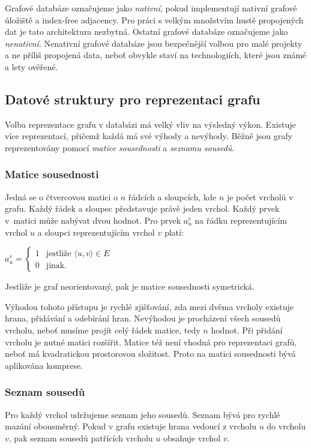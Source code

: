 \documentclass[
  program=infoi,
  biblatex=true,
  figures=true,
  glossaries=false,
  index,
  sourcecodes=true
]{kidiplom}
\begin{document}
Grafové databáze označujeme jako \textit{nativní}, pokud implementují nativní grafové úložiště a index-free adjacency. Pro práci s velkým množstvím hustě propojených dat je tato architektura nezbytná. Ostatní grafové databáze označujeme jako \textit{nenativní}. Nenativní grafové databáze jsou bezpečnější volbou pro malé projekty a ne příliš propojená data, neboť obvykle staví na technologiích, které jsou známé a lety ověřené.

\subsection{Datové struktury pro reprezentaci grafu}
Volba reprezentace grafu v databázi má velký vliv na výsledný výkon. Existuje více reprezentací, přičemž každá má své výhody a nevýhody. Běžně jsou grafy reprezentovány pomocí \textit{matice sousednosti} a \textit{seznamu sousedů}.

\subsubsection{Matice sousednosti}
Jedná se o čtvercovou matici o $n$ řádcích a sloupcích, kde $n$ je počet vrcholů v grafu. Každý řádek a sloupec představuje právě jeden vrchol. Každý prvek v~matici může nabývat dvou hodnot. Pro prvek $a_u^v$ na řádku reprezentujícím vrchol $u$ a sloupci reprezentujícím vrchol $v$ platí:
\begin{center}
$
 a_u^v =
    \begin{cases}
        1 & \text{jestliže } \langle u,v \rangle \in E \\
        0 & \text{jinak.}
    \end{cases}
$
\end{center}
Jestliže je graf neorientovaný, pak je matice sousednosti symetrická.

Výhodou tohoto přístupu je rychlé zjišťování, zda mezi dvěma vrcholy existuje hrana, přidávání a odebírání hran. Nevýhodou je procházení všech sousedů vrcholu, neboť musíme projít celý řádek matice, tedy $n$ hodnot. Při přidání vrcholu je nutné matici rozšířit. Matice též není vhodná pro reprezentaci  grafů, neboť má kvadratickou prostorovou složitost. Proto na matici sousednosti bývá aplikována komprese.

\subsubsection{Seznam sousedů}
Pro každý vrchol udržujeme seznam jeho sousedů. Seznam bývá pro rychlé mazání obousměrný. Pokud v grafu existuje hrana vedoucí z vrcholu $u$ do vrcholu $v$, pak seznam sousedů patřících vrcholu $u$ obsahuje vrchol $v$.
\end{document}

